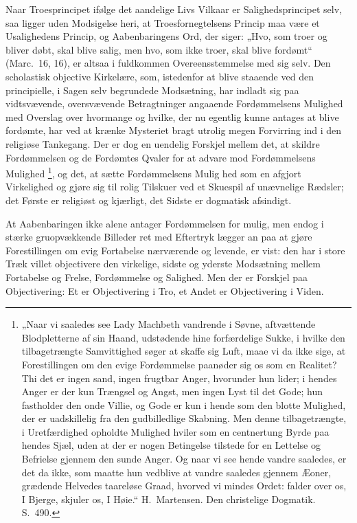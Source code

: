 \documentclass[12pt]{book}
\begin{document}
Naar Troesprincipet ifølge det aandelige Livs Vilkaar er
Salighedsprincipet selv, saa ligger uden Modsigelse heri, at
Troesfornegtelsens Princip maa være et Usalighedens Princip, og
Aabenbaringens Ord, der siger: „Hvo, som troer og bliver døbt, skal
blive salig, men hvo, som ikke troer, skal blive fordømt“
(Marc.\ 16, 16), er altsaa i fuldkommen Overeensstemmelse med sig
selv. Den scholastisk objective Kirkelære, som, istedenfor at blive
staaende ved den principielle, i Sagen selv begrundede Modsætning,
har indladt sig paa vidtsvævende, oversvævende Betragtninger
angaaende Fordømmelsens Mulighed med Overslag over hvormange og
hvilke, der nu egentlig kunne antages at blive fordømte, har ved at
krænke Mysteriet bragt utrolig megen Forvirring ind i den religiøse
Tankegang. Der er dog en uendelig Forskjel mellem det, at skildre
Fordømmelsen og de Fordømtes Qvaler for at advare mod Fordømmelsens
Mulighed%
\footnote{„Naar vi saaledes see Lady Machbeth vandrende i Søvne,
aftvættende Blodpletterne af sin Haand, udstødende hine forfærdelige
Sukke, i hvilke den tilbagetrængte Samvittighed søger at skaffe sig
Luft, maae vi da ikke sige, at Forestillingen om den evige
Fordømmelse paanøder sig os som en Realitet? Thi det er ingen sand,
ingen frugtbar Anger, hvorunder hun lider; i hendes Anger er der kun
Trængsel og Angst, men ingen Lyst til det Gode; hun fastholder den
onde Villie, og Gode er kun i hende som den blotte Mulighed, der er
uadskillelig fra den gudbilledlige Skabning. Men denne
tilbagetrængte, i Uretfærdighed opholdte Mulighed hviler som en
centnertung Byrde paa hendes Sjæl, uden at der er nogen Betingelse
tilstede for en Lettelse og Befrielse gjennem den sunde Anger. Og
naar vi see hende vandre saaledes, er det da ikke, som maatte hun
vedblive at vandre saaledes gjennem Æoner, grædende Helvedes
taareløse Graad, hvorved vi mindes Ordet: falder over os, I Bjerge,
skjuler os, I Høie.“ H.\ Martensen. Den christelige Dogmatik.
S.\ 490.}, og det, at sætte Fordømmelsens Mulig\-
hed som en afgjort Virkelighed og gjøre sig til rolig Tilskuer ved
et Skuespil af unævnelige Rædsler; det Første er religiøst og
kjærligt, det Sidste er dogmatisk afsindigt.

At Aabenbaringen ikke alene antager Fordømmelsen for mulig, men
endog i stærke gruopvækkende Billeder ret med Eftertryk lægger an
paa at gjøre Forestillingen om evig Fortabelse nærværende og
levende, er vist: den har i store Træk villet objectivere den
virkelige, sidste og yderste Modsætning mellem Fortabelse og Frelse,
Fordømmelse og Salighed. Men der er Forskjel paa Objectivering: Et
er Objectivering i Tro, et Andet er Objectivering i Viden.
\end{document}
